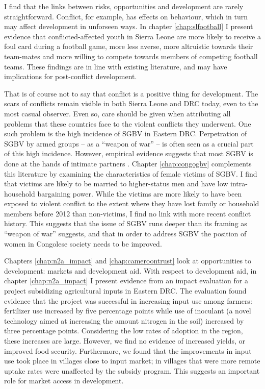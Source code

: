 I find that the links between risks, opportunities and development are rarely straightforward. Conflict, for example, has effects on behaviour, which in turn may affect development in unforseen ways. In chapter \ref{chap:slfootball} I present  evidence that conflicted-affected youth in Sierra Leone are more likely to receive a foul card during a football game, more less averse,  more altruistic towards their team-mates and more willing to compete towards members of competing football teams. These findings are in line with existing literature, and may have implications for post-conflict development. 

That is of course not to say that conflict is a positive thing for development. The scars of conflicts remain visible in both Sierra Leone and DRC today, even to the most casual observer. Even so, care should be given when attributing all problems that these countries face to the violent conflicts they underwent. One such problem is the high incidence of SGBV in Eastern DRC. Perpetration of SGBV by armed groups -- as a ``weapon of war'' -- is often seen as a crucial part of this high incidence. However, empirical evidence suggests that most SGBV is done at the hands of intimate partners \citep[see e.g.][]{Peterman2011}. Chapter \ref{chap:congogbv} complements this literature by examining the characteristics of female victims of SGBV. I find that victims are likely to be married to higher-status men and have low intra-household bargaining power. While the victims are more likely to have been exposed to violent conflict to the extent where they have lost family or household members before 2012 than non-victims, I find no link with more recent conflict history. This suggests that the issue of SGBV runs deeper than its framing as ``weapon of war'' suggests, and that  in order to address SGBV the position of women in Congolese society needs to be improved.

Chapters \ref{chap:n2a_impact} and \ref{chap:cameroontrust} look at opportunities to development: markets and development aid. With respect to development aid, in chapter \ref{chap:n2a_impact} I present evidence from an impact evaluation for a project subsidizing agricultural inputs in Eastern DRC. The evaluation found evidence that the project was successful in increasing input use among farmers: fertilizer use increased by five percentage points while use of inoculant (a novel technology aimed at increasing the amount nitrogen in the soil) increased by three percentage points. Considering the low rates of adoption in the region, these increases are large. However, we find no evidence of increased yields, or improved food security. Furthermore, we found that the improvements in input use took place in villages close to input market; in villages that were more remote uptake rates were unaffected by the subsidy program. This suggests an important role for market access in development.

